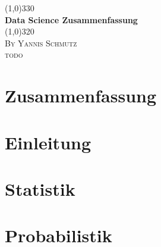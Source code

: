\documentclass{article}
\begin{document}
\begin{titlepage}
	
	\begin{center}
	\line(1,0){330} \\
	[2mm]
	\huge{\bfseries Data Science Zusammenfassung} \\
	[2mm]
	\line(1,0){320} \\
	[1,5cm]
	\textsc{\LARGE By Yannis Schmutz} \\
	[0.75cm]
	\textsc{\large todo} \\
	
	\end{center}
	
\end{titlepage}
\section*{Zusammenfassung}	%
\cleardoublepage	%
\tableofcontents		%
\thispagestyle{empty}	%
\cleardoublepage	%
\setcounter{page}{1}		%
\section{Einleitung}\label{sec:intro}

\lipsum[1]

\section{Statistik}\label{sec:stat}

\newpage
\section{Probabilistik}
\end{document}
